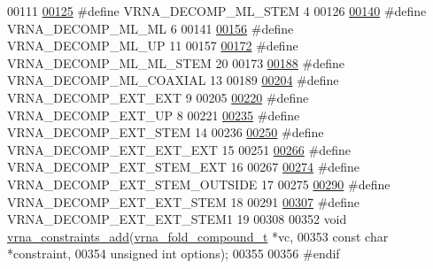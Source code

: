 \begin{DoxyCode}
00111 
\hypertarget{constraints_8h_source_l00125}{}\hyperlink{group__constraints_ga4a23054c75d8efc785de50e3ea87602f}{00125} \textcolor{preprocessor}{#define VRNA\_DECOMP\_ML\_STEM     4}
00126 
\hypertarget{constraints_8h_source_l00140}{}\hyperlink{group__constraints_ga7f4cb9ff7a33e67f0539bd39e7b19a78}{00140} \textcolor{preprocessor}{#define VRNA\_DECOMP\_ML\_ML       6}
00141 
\hypertarget{constraints_8h_source_l00156}{}\hyperlink{group__constraints_gae6478dda14e50e2f2cb9ef333a29256e}{00156} \textcolor{preprocessor}{#define VRNA\_DECOMP\_ML\_UP       11}
00157 
\hypertarget{constraints_8h_source_l00172}{}\hyperlink{group__constraints_ga63d8ceb8c96ae3b463e529e28cc0fe98}{00172} \textcolor{preprocessor}{#define VRNA\_DECOMP\_ML\_ML\_STEM 20}
00173 
\hypertarget{constraints_8h_source_l00188}{}\hyperlink{group__constraints_ga4fe48d575830b16c208e280e01ab1497}{00188} \textcolor{preprocessor}{#define VRNA\_DECOMP\_ML\_COAXIAL  13}
00189 
\hypertarget{constraints_8h_source_l00204}{}\hyperlink{group__constraints_ga437adf5115c1999304eff26b41e4c9b6}{00204} \textcolor{preprocessor}{#define VRNA\_DECOMP\_EXT\_EXT     9}
00205 
\hypertarget{constraints_8h_source_l00220}{}\hyperlink{group__constraints_gaff1ddaffe86d984623910b40cc8a8717}{00220} \textcolor{preprocessor}{#define VRNA\_DECOMP\_EXT\_UP      8}
00221 
\hypertarget{constraints_8h_source_l00235}{}\hyperlink{group__constraints_gae44b5ace0d9b4a29088069ecb4cec441}{00235} \textcolor{preprocessor}{#define VRNA\_DECOMP\_EXT\_STEM 14}
00236 
\hypertarget{constraints_8h_source_l00250}{}\hyperlink{group__constraints_ga803bd818b3f4b2b0a4a5cfa2f7dc2045}{00250} \textcolor{preprocessor}{#define VRNA\_DECOMP\_EXT\_EXT\_EXT 15}
00251 
\hypertarget{constraints_8h_source_l00266}{}\hyperlink{group__constraints_gabb09c5b78b75a44502fc77b950125c1e}{00266} \textcolor{preprocessor}{#define VRNA\_DECOMP\_EXT\_STEM\_EXT 16}
00267 
\hypertarget{constraints_8h_source_l00274}{}\hyperlink{group__constraints_gae7554cd3ff089360c02e4920229e221c}{00274} \textcolor{preprocessor}{#define VRNA\_DECOMP\_EXT\_STEM\_OUTSIDE 17}
00275 
\hypertarget{constraints_8h_source_l00290}{}\hyperlink{group__constraints_ga06efd054c9271438f6d82d4559d9e69f}{00290} \textcolor{preprocessor}{#define VRNA\_DECOMP\_EXT\_EXT\_STEM 18}
00291 
\hypertarget{constraints_8h_source_l00307}{}\hyperlink{group__constraints_ga2e75d7a77118735b32f25422d9686719}{00307} \textcolor{preprocessor}{#define VRNA\_DECOMP\_EXT\_EXT\_STEM1 19}
00308 
00352 \textcolor{keywordtype}{void} \hyperlink{group__constraints_ga35a401f680969a556858a8dd5f1d07cc}{vrna\_constraints\_add}(\hyperlink{group__fold__compound_structvrna__fc__s}{vrna\_fold\_compound\_t} *vc,
00353                           \textcolor{keyword}{const} \textcolor{keywordtype}{char} *constraint,
00354                           \textcolor{keywordtype}{unsigned} \textcolor{keywordtype}{int} options);
00355 
00356 \textcolor{preprocessor}{#endif}
\end{DoxyCode}
